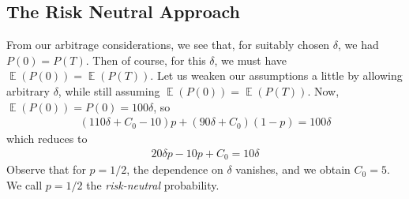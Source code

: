 \documentclass[12pt]{article}
\DeclareMathOperator{\ex}{\mathbb{E}}
\theoremstyle{plain}
\theoremstyle{definition}
\theoremstyle{remark}
\numberwithin{equation}{section}  %
\begin{document}
\subsection{The Risk Neutral Approach}
From our arbitrage considerations, we see that, for suitably chosen
$\delta$, we had $P(0) = P(T)$. Then of course, for this $\delta$, we must
have $\ex(P(0)) = \ex(P(T))$. Let us weaken our assumptions a little by allowing
arbitrary $\delta$, while still assuming $\ex(P(0)) = \ex(P(T))$. 
Now, $\ex(P(0)) = P(0) = 100 \delta$, so
\begin{equation*}
	\begin{split}
		(110 \delta + C_{0} - 10) p + (90 \delta + C_{0}) (1- p) = 100 \delta
	\end{split}
\end{equation*}
which reduces to
\begin{equation*}
	\begin{split}
		20 \delta p - 10p + C_{0} = 10 \delta
	\end{split}
\end{equation*}
Observe that for $p = 1/2$, the dependence on $\delta$ vanishes, and we obtain
$C_{0} = 5$. We call $p = 1/2$ the \emph{risk-neutral} probability.
\end{document}
